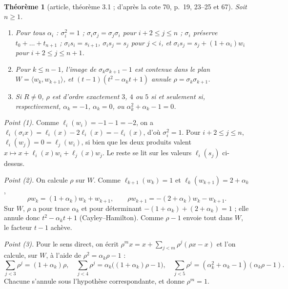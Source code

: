 \documentclass[11pt,a4paper]{amsart}
\theoremstyle{definition}
\theoremstyle{plain}
\newtheorem{theoreme}{Théorème}
\theoremstyle{remark}
\begin{document}
\begin{theoreme}[article, théorème 3.1 ; d'après la cote 70, p.~19, 23--25 et 67]\label{thm:univ}
Soit $n \ge 1$.
\begin{enumerate}
\item Pour tous $\alpha_i$ : $\sigma_i^2 = 1$ ; $\sigma_i\sigma_j = \sigma_j\sigma_i$ pour $i + 2 \le j \le n$ ; $\sigma_i$ préserve $t_0 + \dots + t_{n+1}$ ; $\sigma_is_i = s_{i+1}$, $\sigma_is_j = s_j$ pour $j < i$, et $\sigma_is_j = s_j + (1 + \alpha_i)w_i$ pour $i + 2 \le j \le n+1$.
\item Pour $k \le n - 1$, l'image de $\sigma_k\sigma_{k+1} - 1$ est contenue dans le plan $W = \langle w_k, w_{k+1}\rangle$, et $(t - 1)(t^2 - \alpha_kt + 1)$ annule $\rho = \sigma_k\sigma_{k+1}$.
\item Si $R \ne 0$, $\rho$ est d'ordre exactement $3$, $4$ ou $5$ si et seulement si, respectivement, $\alpha_k = -1$, $\alpha_k = 0$, ou $\alpha_k^2 + \alpha_k - 1 = 0$.
\end{enumerate}
\end{theoreme}

\emph{Point (1).} Comme $\ell_i(w_i) = -1 - 1 = -2$, on a $\ell_i(\sigma_ix) = \ell_i(x) - 2\ell_i(x) = -\ell_i(x)$, d'où $\sigma_i^2 = 1$. Pour $i + 2 \le j \le n$, $\ell_i(w_j) = 0 = \ell_j(w_i)$, si bien que les deux produits valent $x \mapsto x + \ell_i(x)w_i + \ell_j(x)w_j$. Le reste se lit sur les valeurs $\ell_i(s_j)$ ci-dessus.

\emph{Point (2).} On calcule $\rho$ sur $W$. Comme $\ell_{k+1}(w_k) = 1$ et $\ell_k(w_{k+1}) = 2 + \alpha_k$,
\[
\rho w_k = (1 + \alpha_k)w_k + w_{k+1}, \qquad \rho w_{k+1} = -(2 + \alpha_k)w_k - w_{k+1}.
\]
Sur $W$, $\rho$ a pour trace $\alpha_k$ et pour déterminant $-(1 + \alpha_k) + (2 + \alpha_k) = 1$ ; elle annule donc $t^2 - \alpha_k t + 1$ (Cayley--Hamilton). Comme $\rho - 1$ envoie tout dans $W$, le facteur $t - 1$ achève.

\emph{Point (3).} Pour le sens direct, on écrit $\rho^m x = x + \sum_{j<m}\rho^j(\rho x - x)$ et l'on calcule, sur $W$, à l'aide de $\rho^2 = \alpha_k\rho - 1$ :
\[
\sum_{j<3}\rho^j = (1 + \alpha_k)\rho, \quad \sum_{j<4}\rho^j = \alpha_k\bigl((1 + \alpha_k)\rho - 1\bigr), \quad \sum_{j<5}\rho^j = (\alpha_k^2 + \alpha_k - 1)(\alpha_k\rho - 1).
\]
Chacune s'annule sous l'hypothèse correspondante, et donne $\rho^m = 1$.
\end{document}
